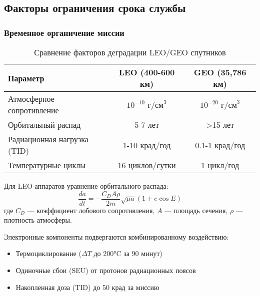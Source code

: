 \subsection{Факторы ограничения срока службы}

\subsubsection{Временное органичение миссии}

\begin{table}[htbp]
	\centering
	\caption{Сравнение факторов деградации LEO/GEO спутников}
	\begin{tabular}{|l|c|c|}
		\hline
		Параметр                    & LEO (400-600 км)           & GEO (35,786 км)            \\
		\hline
		Атмосферное сопротивление   & $10^{-10}$ $\text{г/см}^3$ & $10^{-20}$ $\text{г/см}^3$ \\
		Орбитальный распад          & 5-7 лет                    & >15 лет                    \\
		Радиационная нагрузка (TID) & 1-10 крад/год              & 0.1-1 крад/год             \\
		Температурные циклы         & 16 циклов/сутки            & 1 цикл/год                 \\
		\hline
	\end{tabular}
\end{table}

Для LEO-аппаратов уравнение орбитального распада:
\begin{equation}
	\frac{da}{dt} = -\frac{C_D A \rho}{2m} \sqrt{\mu a}(1 + e\cos E)
\end{equation}
где $C_D$  — коэффициент лобового сопротивления, $A$ — площадь сечения, $\rho$ — плотность атмосферы.

Электронные компоненты подвергаются комбинированному воздействию:
\begin{itemize}
	\item Термоциклирование ($\Delta T$ до 200°C за 90 минут)
	\item Одиночные сбои (SEU) от протонов радиационных поясов
	\item Накопленная доза (TID) до 50 крад за миссию
\end{itemize}

